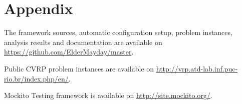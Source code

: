 \documentclass[12pt,a4paper,oneside]{book}
\begin{document}
\printindex %







\chapter{Appendix}

The framework sources, automatic configuration setup, problem instances, analysis results and documentation are available on \url{https://github.com/ElderMayday/master}.

Public CVRP problem instances are available on \url{http://vrp.atd-lab.inf.puc-rio.br/index.php/en/}.

Mockito Testing framework is available on \url{http://site.mockito.org/}.
\end{document}
